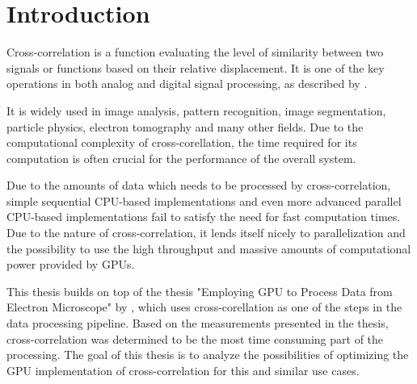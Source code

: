 \chapter{Introduction}
Cross-correlation is a function evaluating the level of similarity between two signals or functions based on their relative displacement. It is one of the key operations in both analog and digital signal processing, as described by \citep{Kapinchev2015}. 

It is widely used in image analysis, pattern recognition, image segmentation, particle physics, electron tomography and many other fields. Due to the computational complexity of cross-corellation, the time required for its computation is often crucial for the performance of the overall system.

Due to the amounts of data which needs to be processed by cross-correlation, simple sequential CPU-based implementations and even more advanced parallel CPU-based implementations fail to satisfy the need for fast computation times. Due to the nature of cross-correlation, it lends itself nicely to parallelization and the possibility to use the high throughput and massive amounts of computational power provided by GPUs.

This thesis builds on top of the thesis "Employing GPU to Process Data from Electron Microscope" by \citep{misko}, which uses cross-corellation as one of the steps in the data processing pipeline. Based on the measurements presented in the thesis, cross-correlation was determined to be the most time consuming part of the processing. The goal of this thesis is to analyze the possibilities of optimizing the GPU implementation of cross-correlation for this and similar use cases. 



